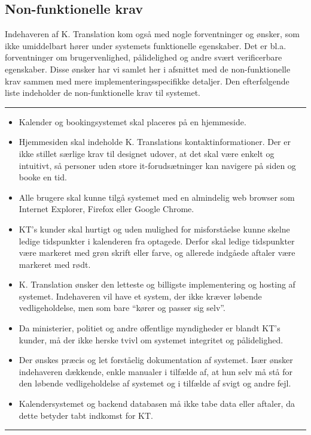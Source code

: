 \documentclass[12pt]{article}   %
\begin{document}
\subsection{Non-funktionelle krav}
Indehaveren af K. Translation kom også med nogle forventninger og ønsker, som
ikke umiddelbart hører under systemets funktionelle egenskaber. Det er bl.a.
forventninger om brugervenlighed, pålidelighed og andre svært verificerbare
egenskaber. Disse ønsker har vi samlet her i afsnittet med de non-funktionelle
krav sammen med mere implementeringsspecifikke detaljer. Den efterfølgende liste
indeholder de non-funktionelle krav til systemet.\\

\rule{120mm}{1mm}
\begin{itemize}
\item Kalender og bookingsystemet skal placeres på en hjemmeside.
\item Hjemmesiden skal indeholde K. Translations kontaktinformationer. Der er
	ikke stillet særlige krav til designet udover, at det skal være enkelt
	og intuitivt, så personer uden store it-forudsætninger kan navigere på
	siden og booke en tid.
\item Alle brugere skal kunne tilgå systemet med en almindelig web browser som
	Internet Explorer, Firefox eller Google Chrome.
\item KT's kunder skal hurtigt og uden mulighed for misforståelse kunne skelne ledige
	tidspunkter i kalenderen fra optagede. Derfor skal ledige tidspunkter
	være markeret med grøn skrift eller farve, og allerede indgåede aftaler
	være markeret med rødt.
\item K. Translation ønsker den letteste og billigste implementering og
	hosting af systemet. Indehaveren vil have et system, der ikke kræver løbende
	vedligeholdelse, men som bare ``kører og passer sig selv''.   
\item Da ministerier, politiet og andre offentlige myndigheder er blandt KT's
	kunder, må der ikke herske tvivl om systemet integritet og
	pålidelighed.
\item Der ønskes præcis og let forståelig dokumentation af systemet. 
	Især ønsker indehaveren dækkende, enkle manualer i tilfælde af, at hun
	selv må stå for den løbende vedligeholdelse af systemet og i tilfælde
	af svigt og andre fejl.
\item Kalendersystemet og backend databasen må ikke tabe data eller aftaler,
	da dette betyder tabt indkomst for KT.
\end{itemize}
\rule{120mm}{1mm}
\vspace{0.5cm}
\end{document}
